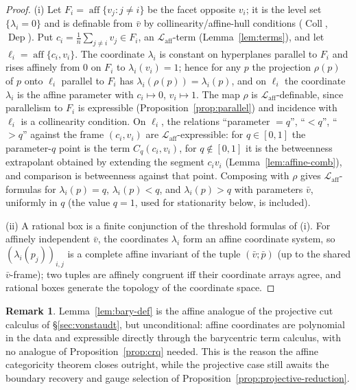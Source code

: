 \documentclass[11pt]{amsart}
\theoremstyle{definition}
\newtheorem{remark}[theorem]{Remark}
\newcommand{\Laff}{\mathcal{L}_{\mathrm{aff}}}
\newcommand{\Coll}{\operatorname{Coll}}
\newcommand{\Dep}{\operatorname{Dep}}
\newcommand{\aff}{\operatorname{aff}}
\begin{document}
\begin{proof}
(i) Let $F_i=\aff\{v_j:j\ne i\}$ be the facet opposite $v_i$; it is the level
set $\{\lambda_i=0\}$ and is definable from $\bar v$ by collinearity/affine-hull
conditions ($\Coll$, $\Dep$). Put $c_i=\frac1n\sum_{j\ne i}v_j\in F_i$, an
$\Laff$-term (Lemma~\ref{lem:terms}), and let $\ell_i=\aff\{c_i,v_i\}$. The
coordinate $\lambda_i$ is constant on hyperplanes parallel to $F_i$ and rises
affinely from $0$ on $F_i$ to $\lambda_i(v_i)=1$; hence for any $p$ the
projection $\rho(p)$ of $p$ onto $\ell_i$ parallel to $F_i$ has
$\lambda_i(\rho(p))=\lambda_i(p)$, and on $\ell_i$ the coordinate $\lambda_i$
is the affine parameter with $c_i\mapsto0$, $v_i\mapsto1$. The map $\rho$ is
$\Laff$-definable, since parallelism to $F_i$ is expressible
(Proposition~\ref{prop:parallel}) and incidence with $\ell_i$ is a
collinearity condition. On $\ell_i$, the relations ``parameter $=q$'',
``$<q$'', ``$>q$'' against the frame $(c_i,v_i)$ are $\Laff$-expressible: for
$q\in[0,1]$ the parameter-$q$ point is the term $C_q(c_i,v_i)$, for $q\notin
[0,1]$ it is the betweenness extrapolant obtained by extending the segment
$c_iv_i$ (Lemma~\ref{lem:affine-comb}), and comparison is betweenness against
that point. Composing with $\rho$ gives $\Laff$-formulas for $\lambda_i(p)=q$,
$\lambda_i(p)<q$, and $\lambda_i(p)>q$ with parameters $\bar v$, uniformly in
$q$ (the value $q=1$, used for stationarity below, is included).

(ii) A rational box is a finite conjunction of the threshold formulas of (i).
For affinely independent $\bar v$, the coordinates $\lambda_i$ form an affine
coordinate system, so $(\lambda_i(p_j))_{i,j}$ is a complete affine invariant
of the tuple $(\bar v;\bar p)$ (up to the shared $\bar v$-frame); two tuples
are affinely congruent iff their coordinate arrays agree, and rational boxes
generate the topology of the coordinate space.
\end{proof}

\begin{remark}
Lemma~\ref{lem:bary-def} is the affine analogue of the projective cut
calculus of \S\ref{sec:vonstaudt}, but unconditional: affine coordinates are
polynomial in the data and expressible directly through the barycentric term
calculus, with no analogue of Proposition~\ref{prop:crq} needed. This is the
reason the affine categoricity theorem closes outright, while the projective
case still awaits the boundary recovery and gauge selection of
Proposition~\ref{prop:projective-reduction}.
\end{remark}
\end{document}
